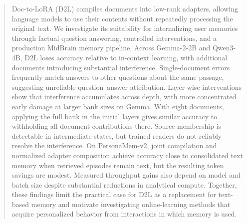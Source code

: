 \documentclass{article}
\begin{document}

{\let\thefootnote\relax{}}

\begin{abstract}
Doc-to-LoRA (D2L) compiles documents into low-rank adapters, allowing language
models to use their contents without repeatedly processing the original text.
We investigate its suitability for internalizing user memories through factual
question answering, controlled interventions, and a production MidBrain memory
pipeline. Across Gemma-2-2B and Qwen3-4B, D2L loses accuracy relative to
in-context learning, with additional documents introducing substantial
interference. Single-document errors frequently match answers to other questions
about the same passage, suggesting unreliable question--answer attribution.
Layer-wise interventions show that interference accumulates across depth,
with more concentrated early damage at larger bank sizes on Gemma. With eight
documents, applying the full bank in the initial layers gives similar accuracy
to withholding all document contributions there. Source membership is
detectable in intermediate states, but trained readers do not reliably
resolve the interference.
On PersonaMem-v2, joint compilation and normalized adapter composition achieve
accuracy close to consolidated text memory when retrieved episodes remain text,
but the resulting token savings are modest. Measured throughput gains also
depend on model and batch size despite substantial reductions in analytical
compute. Together, these findings limit the practical case for D2L as a
replacement for text-based memory and motivate investigating online-learning
methods that acquire personalized behavior from interactions in which memory
is used.
\end{abstract}
\end{document}
